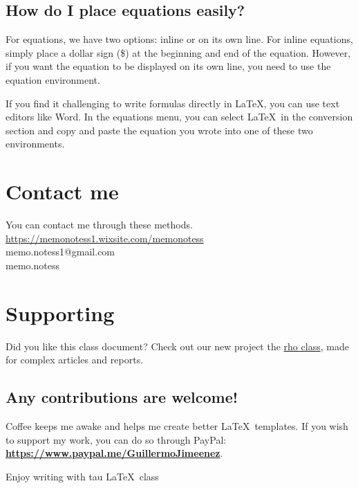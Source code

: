 \documentclass[9pt,a4paper,twocolumn,twoside]{tau-class/tau}
\begin{document}
    \subsection*{How do I place equations easily?}

        For equations, we have two options: inline or on its own line. For inline equations, simply place a dollar sign (\$) at the beginning and end of the equation. However, if you want the equation to be displayed on its own line, you need to use the equation environment.
        
        If you find it challenging to write formulas directly in \LaTeX, you can use text editors like Word. In the equations menu, you can select \LaTeX\ in the conversion section and copy and paste the equation you wrote into one of these two environments.

\section{Contact me}

    You can contact me through these methods.\\
    
    \noindent\faWix\hspace{5pt}\href{https://memonotess1.wixsite.com/memonotess}{https://memonotess1.wixsite.com/memonotess} \\
    \faEnvelope[regular]\hspace{7pt}memo.notess1@gmail.com \\
    \faInstagram\hspace{8pt}memo.notess

\section{Supporting}

    Did you like this class document? Check out our new project the \href{https://es.overleaf.com/latex/templates/rho-class-academic-article-template/bpgjxjjqhtfy}{rho class}, made for complex articles and reports.

    \subsection*{Any contributions are welcome!}
    
        Coffee keeps me awake and helps me create better \LaTeX\ templates. If you wish to support my work, you can do so through PayPal:\\
        \textbf{\url{https://www.paypal.me/GuillermoJimeenez}}.
        
        \begin{center}
            Enjoy writing with tau \LaTeX\ class\hspace{5pt}\faChessKnight 
        \end{center}


\printbibliography

\end{document}
